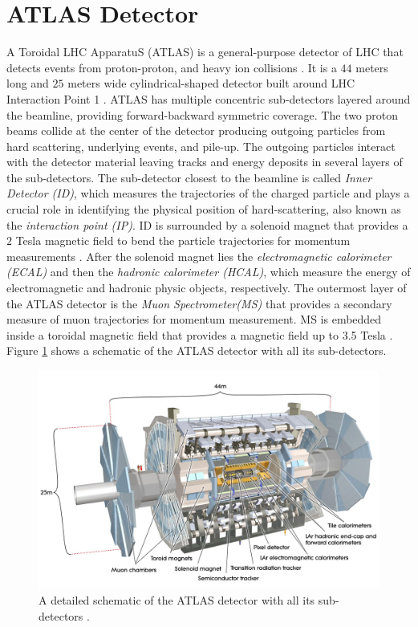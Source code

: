 \section{ATLAS Detector}
\label{sec:ATLAS}

A Toroidal LHC ApparatuS (ATLAS) is a general-purpose detector of LHC that detects events from proton-proton, and heavy ion collisions \cite{ATLAS}. It is a $44$ meters long and $25$ meters wide cylindrical-shaped detector built around LHC Interaction Point 1 \cite{ATLAS}. ATLAS has multiple concentric sub-detectors layered around the beamline, providing forward-backward symmetric coverage. The two proton beams collide at the center of the detector producing outgoing particles from hard scattering, underlying events, and pile-up. The outgoing particles interact with the detector material leaving tracks and energy deposits in several layers of the sub-detectors. The sub-detector closest to the beamline is called \textit{Inner Detector (ID)}, which measures the trajectories of the charged particle and plays a crucial role in identifying the physical position of hard-scattering, also known as the \textit{interaction point (IP)}. ID is surrounded by a solenoid magnet that provides a $2$ Tesla magnetic field to bend the particle trajectories for momentum measurements \cite{ATLAS}. After the solenoid magnet lies the \textit{electromagnetic calorimeter (ECAL)} and then the \textit{hadronic calorimeter (HCAL)}, which measure the energy of electromagnetic and hadronic physic objects, respectively. The outermost layer of the ATLAS detector is the \textit{Muon Spectrometer(MS)} that provides a secondary measure of muon trajectories for momentum measurement. MS is embedded inside a toroidal magnetic field that provides a magnetic field up to 3.5 Tesla \cite{ATLAS}. Figure \ref{fig:ATLAS} shows a schematic of the ATLAS detector with all its sub-detectors.

\begin{figure}
    \centering
    \includegraphics[width=.98\linewidth]{figures/LHC/AtlasDetector.png}
    \caption{ A detailed schematic of the ATLAS detector with all its sub-detectors \cite{ATLAS}.\label{fig:ATLAS}}
\end{figure}

